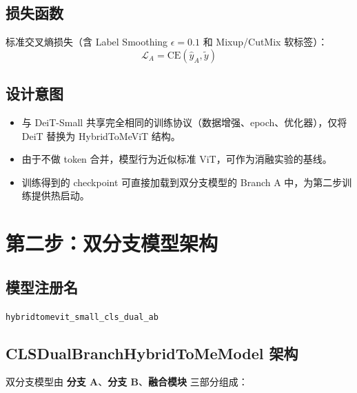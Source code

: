 \documentclass[a4paper,11pt]{article}
\begin{document}
\subsection{损失函数}

标准交叉熵损失（含 Label Smoothing $\epsilon=0.1$ 和 Mixup/CutMix 软标签）：
\[
    \mathcal{L}_A = \text{CE}(\hat{y}_A, \tilde{y})
\]

\subsection{设计意图}

\begin{itemize}
    \item 与 DeiT-Small 共享完全相同的训练协议（数据增强、epoch、优化器），仅将 DeiT 替换为 HybridToMeViT 结构。
    \item 由于不做 token 合并，模型行为近似标准 ViT，可作为消融实验的基线。
    \item 训练得到的 checkpoint 可直接加载到双分支模型的 Branch A 中，为第二步训练提供热启动。
\end{itemize}

\section{第二步：双分支模型架构}

\subsection{模型注册名}

\texttt{hybridtomevit\_small\_cls\_dual\_ab}

\subsection{CLSDualBranchHybridToMeModel 架构}

双分支模型由 \textbf{分支 A}、\textbf{分支 B}、\textbf{融合模块} 三部分组成：
\end{document}
